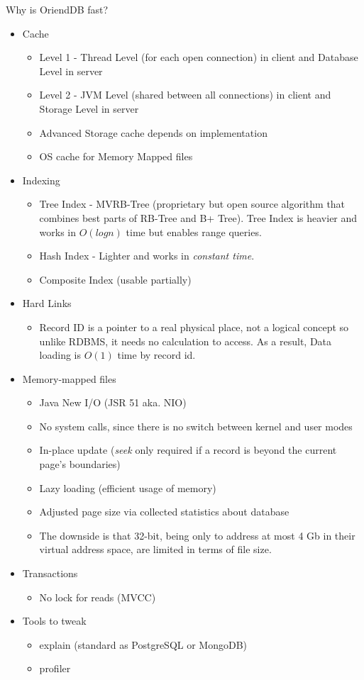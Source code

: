Why is OriendDB fast?

\begin{itemize}
  \item Cache
  \begin{itemize}
    \item Level 1 - Thread Level (for each open connection) in client and Database Level in server
    \item Level 2 - JVM Level (shared between all connections) in client and Storage Level in server
    \item Advanced Storage cache depends on implementation
    \item OS cache for Memory Mapped files
  \end{itemize}
  \item Indexing
  \begin{itemize}
    \item Tree Index - MVRB-Tree (proprietary but open source algorithm that combines best parts of RB-Tree and B+ Tree). Tree Index is heavier and works in $O(logn)$ time but enables range queries.
    \item Hash Index - Lighter and works in \textit{constant time}.
    \item Composite Index (usable partially)
  \end{itemize}
  \item Hard Links
  \begin{itemize}
    \item Record ID is a pointer to a real physical place, not a logical concept so unlike RDBMS, it needs no calculation to access. As a result, Data loading is $O(1)$ time by record id.
  \end{itemize}
  \item Memory-mapped files
  \begin{itemize}
    \item Java New I/O (JSR 51 aka. NIO)
    \item No system calls, since there is no switch between kernel and user modes
	\item In-place update (\textit{seek} only required if a record is beyond the current page's boundaries)
	\item Lazy loading (efficient usage of memory)
	\item Adjusted page size via collected statistics about database
	\item The downside is that 32-bit, being only to address at most 4 Gb in their virtual address space, are limited in terms of file size.
  \end{itemize}
  \item Transactions
  \begin{itemize}
    \item No lock for reads (MVCC)
  \end{itemize}
  \item Tools to tweak
  \begin{itemize}
    \item explain (standard as PostgreSQL or MongoDB)
    \item profiler
  \end{itemize}
\end{itemize}

